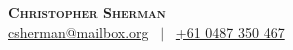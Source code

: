 \documentclass[letterpaper,12pt]{res}
\begin{document}
\noindent \textbf{\Huge \scshape Christopher Sherman} \\ 
\vspace{0.2cm}
\href{mailto:csherman@mailbox.org}{csherman@mailbox.org} \ $|$ \ \href{tel:+61487350467}{+61 0487 350 467}  \\











 
\end{document}
